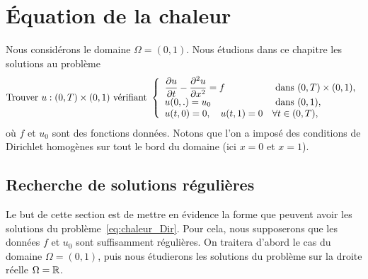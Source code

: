 \documentclass[12pt,a4paper,twoside]{article}
\begin{document}
\begin{exercise}
\begin{enumerate}
  \end{enumerate}
  

\end{exercise}


\section{\'Equation de la chaleur}

Nous consid\'erons le domaine $\Omega = (0,1)$.
Nous \'etudions dans ce chapitre les solutions au probl\`eme
\begin{equation}
  \label{eq:chaleur_Dir}
  \text{Trouver $u : (0,T) \times (0,1)$ v\'erifiant }
  \left\{
    \begin{array}{l l}
      \dfrac{\partial u}{\partial t} - \dfrac{\partial^2 u}{\partial x^2} = f 
      &\text{ dans } (0,T) \times (0,1) ,
      \\
      u(0,.) = u_0 
      & \text{ dans } (0,1) ,
      \\
      u(t,0) = 0 , \quad u(t,1) = 0 & \forall t \in (0,T) ,
    \end{array}
  \right.
\end{equation}
o\`u $f$ et $u_0$ sont des fonctions donn\'ees.
Notons que l'on a impos\'e des conditions de Dirichlet homog\`enes sur tout le bord du domaine
(ici $x=0$ et $x=1$).


\subsection{Recherche de solutions r\'eguli\`eres}

Le but de cette section est de mettre en \'evidence la forme que peuvent avoir
les solutions du probl\`eme~\eqref{eq:chaleur_Dir}.
Pour cela, nous supposerons que les donn\'ees $f$ et $u_0$ sont suffisamment r\'eguli\`eres.
On traitera d'abord le cas du domaine $\Omega = (0,1)$, puis nous \'etudierons les solutions
du probl\`eme sur la droite r\'eelle $\Omega = \mathbb{R}$.
\end{document}
